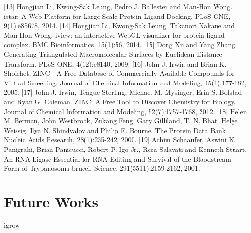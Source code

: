 [13] 	Hongjian Li, Kwong-Sak Leung, Pedro J. Ballester and Man-Hon Wong. istar: A Web Platform for Large-Scale Protein-Ligand Docking. PLoS ONE, 9(1):e85678, 2014.
[14] 	Hongjian Li, Kwong-Sak Leung, Takanori Nakane and Man-Hon Wong. iview: an interactive WebGL visualizer for protein-ligand complex. BMC Bioinformatics, 15(1):56, 2014.
[15] 	Dong Xu and Yang Zhang. Generating Triangulated Macromolecular Surfaces by Euclidean Distance Transform. PLoS ONE, 4(12):e8140, 2009.
[16] 	John J. Irwin and Brian K. Shoichet. ZINC - A Free Database of Commercially Available Compounds for Virtual Screening. Journal of Chemical Information and Modeling, 45(1):177-182, 2005.
[17] 	John J. Irwin, Teague Sterling, Michael M. Mysinger, Erin S. Bolstad and Ryan G. Coleman. ZINC: A Free Tool to Discover Chemistry for Biology. Journal of Chemical Information and Modeling, 52(7):1757-1768, 2012.
[18] 	Helen M. Berman, John Westbrook, Zukang Feng, Gary Gilliland, T. N. Bhat, Helge Weissig, Ilya N. Shindyalov and Philip E. Bourne. The Protein Data Bank. Nucleic Acids Research, 28(1):235-242, 2000.
[19] 	Achim Schnaufer, Aswini K. Panigrahi, Brian Panicucci, Robert P. Igo Jr., Reza Salavati and Kenneth Stuart. An RNA Ligase Essential for RNA Editing and Survival of the Bloodstream Form of Trypanosoma brucei. Science, 291(5511):2159-2162, 2001.

\section{Future Works}

igrow

\chapterend
